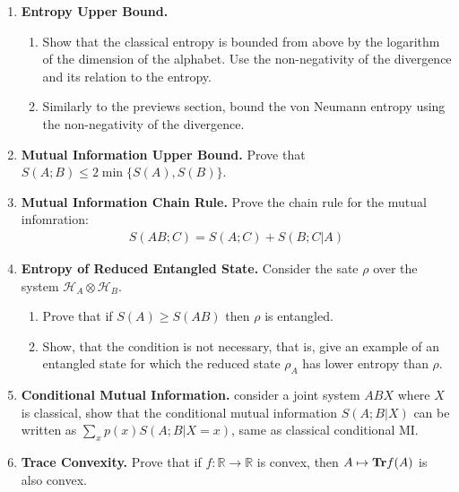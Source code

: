 \documentclass[12pt,a4paper]{article}
\begin{document}
\begin{enumerate}



  \item \textbf{Entropy Upper Bound.}

   \begin{enumerate}
     \item Show that the classical entropy is bounded from above by the logarithm of the dimension of the alphabet. Use the non-negativity of the divergence and its relation to the entropy.


    \item Similarly to the previews section, bound the von Neumann entropy using the non-negativity of the divergence.


  \end{enumerate}

  \item \textbf{Mutual Information Upper Bound.} 
     Prove that $S(A;B) \le 2\min \{S(A), S(B) \}$.




  \item \textbf{Mutual Information Chain Rule.} Prove the chain rule for the mutual infomration:
    \begin{equation*}
      \begin{split}
        S(AB;C) = S(A;C) + S(B;C|A) 
      \end{split}
    \end{equation*}


  \item \textbf{Entropy of Reduced Entangled State.} Consider the sate $\rho$ over the system $\mathcal{H}_{A} \otimes \mathcal{H}_{B}$.
    \begin{enumerate}
      \item Prove that if $S(A) \ge S(AB)$ then $\rho$ is entangled.   


      \item  Show, that the condition is not necessary, that is, give an example of an entangled state for which the reduced state $\rho_A$ has lower entropy than $\rho$. 


    \end{enumerate}


  \item \textbf{Conditional Mutual Information.} consider a joint system $ABX$ where $X$ is classical, show that the conditional mutual information $S(A;B|X)$ can be written as $\sum_x {p(x) S(A;B|X=x)}$, same as classical conditional MI.

    


  \item \textbf{Trace Convexity.} Prove that if $f : \mathbb{R} \rightarrow \mathbb{R}$ is convex, then $A \mapsto \mathbf{Tr} f(A)$ is also convex.

\end{enumerate}
\end{document}
